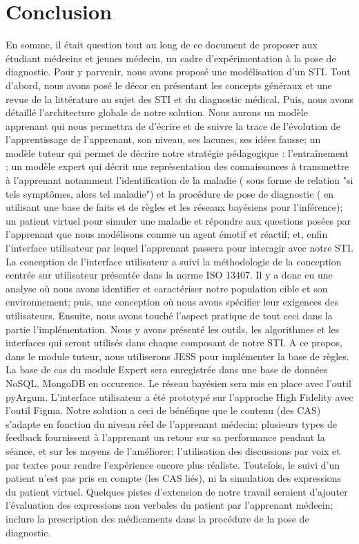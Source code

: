 
\chapter{Conclusion}
\label{chp:conclusion}

En somme, il était question tout au long de ce document de proposer aux étudiant médecins et jeunes médecin, un cadre d'expérimentation à la pose de diagnostic. Pour y parvenir, nous avons proposé une modélisation d'un STI. Tout d'abord, nous avons posé le décor en présentant les concepts généraux et une revue de la littérature au sujet des STI et du diagnostic médical. Puis, nous avons détaillé l'architecture globale de notre solution. Nous aurons un modèle apprenant qui nous permettra de d'écrire et de suivre la trace de l’évolution de l’apprentissage de l’apprenant, son niveau, ses lacunes, ses idées fausse; un modèle tuteur qui permet de décrire notre stratégie pédagogique : l'entraînement ; un modèle expert qui décrit une représentation des connaissances à transmettre à l'apprenant notamment l'identification de la maladie ( sous forme de relation "si tels symptômes, alors tel maladie") et la procédure de pose de diagnostic ( en utilisant une base de faits et de règles et les réseaux bayésiens pour l'inférence); un patient virtuel pour simuler une maladie et répondre aux questions posées par l'apprenant que nous modélisons comme un agent émotif et réactif; et, enfin l'interface utilisateur par lequel l'apprenant passera pour interagir avec notre STI. La conception de l'interface utilisateur a suivi la méthodologie de la conception centrée sur utilisateur présentée dans la norme ISO 13407. Il y a donc eu une analyse où nous avons identifier et caractériser notre population cible et son environnement; puis, une conception où nous avons spécifier leur exigences des utilisateurs. Ensuite, nous avons touché l'aspect pratique de tout ceci dans la partie l'implémentation. Nous y avons présenté les outils, les algorithmes et les interfaces qui seront utilisés dans chaque composant de notre STI. A ce propos, dans le module tuteur, nous utiliserons JESS pour implémenter la base de règles. La base de cas du module Expert sera enregistrée dans une base de données NoSQL, MongoDB en occurence. Le réseau bayésien sera mis en place avec l'outil pyArgum. L'interface utilisateur a été prototypé sur l'approche High Fidelity avec l'outil Figma. Notre solution a ceci de bénéfique que le contenu (des CAS) s'adapte en fonction du niveau réel de l'apprenant médecin; plusieurs types de feedback fournissent à l'apprenant un retour sur sa performance pendant la séance, et sur les moyens de l'améliorer; l'utilisation des discussions par voix et par textes pour rendre l'expérience encore plus réaliste. Toutefois, le suivi d'un patient n'est pas pris en compte (les CAS liés), ni la simulation des expressions du patient virtuel. Quelques pistes d'extension de notre travail seraient d'ajouter l'évaluation des expressions non verbales du patient par l'apprenant médecin; inclure la prescription des médicaments dans la procédure de la pose de diagnostic.